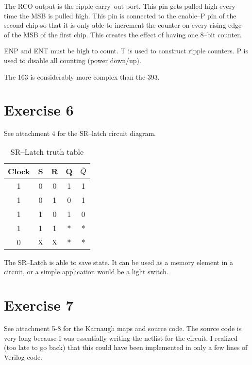\documentclass{article}
\begin{document}
The RCO output is the ripple carry--out port.  This pin gets pulled high every
time the MSB is pulled high.  This pin is connected to the
enable--P pin of the second chip so that it is only able to increment the
counter on every rising edge of the MSB of the first chip.  This creates the
effect of having one 8--bit counter.

ENP and ENT must be high to count.  T is used to construct ripple counters.  P
is used to disable all counting (power down/up).

The 163 is considerably more complex than the 393.


\section{Exercise 6}
See attachment 4 for the SR--latch circuit diagram.

\begin{table}
\begin{center}
\begin{tabular}{|c|c|c||c|c|}
\hline
Clock & S & R & Q & $\overline{Q}$ \\ \hline
1 & 0 & 0 & 1 & 1 \\ \hline
1 & 0 & 1 & 0 & 1 \\ \hline
1 & 1 & 0 & 1 & 0 \\ \hline
1 & 1 & 1 & * & * \\ \hline
0 & X & X & * & * \\ \hline
\end{tabular}
\end{center}
\caption{SR--Latch truth table}
\end{table}

The SR--Latch is able to save state.  It can be used as a memory element in a
circuit, or a simple application would be a light switch.


\section{Exercise 7}
See attachment 5-8 for the Karnaugh maps and source code.  The source code is
very long because I was essentially writing the netlist for the circuit.  I
realized (too late to go back) that this could have been implemented in only
a few lines of Verilog code.
\end{document}
